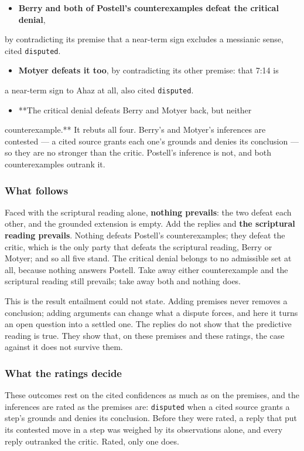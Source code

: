 \documentclass[11pt]{article}
\begin{document}
\begin{itemize}
  \item \textbf{Berry and both of Postell's counterexamples defeat the critical denial},
\end{itemize}
  by contradicting its premise that a near-term sign excludes a messianic   sense, cited \texttt{disputed}.

\begin{itemize}
  \item \textbf{Motyer defeats it too}, by contradicting its other premise: that 7:14 is
\end{itemize}
  a near-term sign to Ahaz at all, also cited \texttt{disputed}.

\begin{itemize}
  \item **The critical denial defeats Berry and Motyer back, but neither
\end{itemize}
  counterexample.** It rebuts all four. Berry's and Motyer's inferences are   contested — a cited source grants each one's grounds and denies its   conclusion — so they are no stronger than the critic. Postell's inference is   not, and both counterexamples outrank it.

\subsubsection*{What follows}
Faced with the scriptural reading alone, \textbf{nothing prevails}: the two defeat each other, and the grounded extension is empty. Add the replies and \textbf{the scriptural reading prevails}. Nothing defeats Postell's counterexamples; they defeat the critic, which is the only party that defeats the scriptural reading, Berry or Motyer; and so all five stand. The critical denial belongs to no admissible set at all, because nothing answers Postell. Take away either counterexample and the scriptural reading still prevails; take away both and nothing does.

This is the result entailment could not state. Adding premises never removes a conclusion; adding arguments can change what a dispute forces, and here it turns an open question into a settled one. The replies do not show that the predictive reading is true. They show that, on these premises and these ratings, the case against it does not survive them.

\subsubsection*{What the ratings decide}
These outcomes rest on the cited confidences as much as on the premises, and the inferences are rated as the premises are: \texttt{disputed} when a cited source grants a step's grounds and denies its conclusion. Before they were rated, a reply that put its contested move in a step was weighed by its observations alone, and every reply outranked the critic. Rated, only one does.
\end{document}
